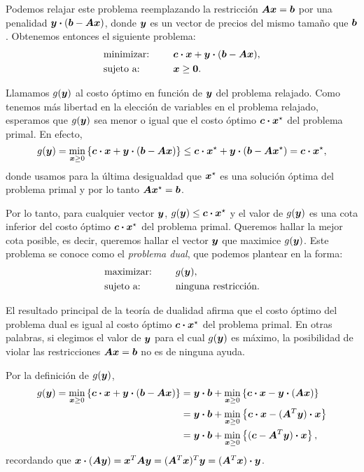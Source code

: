 Podemos relajar este problema reemplazando la restricción $\bm{A}\bm{x} = \bm{b}$ por una penalidad $\bm{y} \boldsymbol{\cdot} (\bm{b} - \bm{A}\bm{x})$, donde $\bm{y}$ es un vector de precios del mismo tamaño que $\bm{b}$. Obtenemos entonces el siguiente problema:
\begin{alignat*}{2}
  & \text{minimizar: } & & \bm{c} \boldsymbol{\cdot} \bm{x} + \bm{y} \boldsymbol{\cdot} (\bm{b} - \bm{A}\bm{x}), \\
   & \text{sujeto a: } & \quad & \bm{x} \ge \bm{0}.
\end{alignat*}

Llamamos $g(\bm{y})$ al costo óptimo en función de $\bm{y}$ del problema relajado. Como tenemos más libertad en la elección de variables en el problema relajado, esperamos que $g(\bm{y})$ sea menor o igual que el costo óptimo $\bm{c} \boldsymbol{\cdot} \bm{x}^\star$ del problema primal. En efecto,
$$
g(\bm{y}) = \min_{\bm{x} \ge 0} \left\{ \bm{c} \boldsymbol{\cdot} \bm{x} + \bm{y} \boldsymbol{\cdot} (\bm{b}-\bm{A}\bm{x})\right\} \le \bm{c} \boldsymbol{\cdot} \bm{x}^\star + \bm{y} \boldsymbol{\cdot} (\bm{b} - \bm{A}\bm{x}^\star) = \bm{c} \boldsymbol{\cdot} \bm{x}^\star,
$$
donde usamos para la última desigualdad que $\bm{x}^\star$ es una solución óptima del problema primal y por lo tanto $\bm{A}\bm{x}^\star = \bm{b}$.

Por lo tanto, para cualquier vector $\bm{y}$, $g(\bm{y}) \le \bm{c} \boldsymbol{\cdot} \bm{x}^\star$ y el valor de $g(\bm{y})$ es una cota inferior del costo óptimo $\bm{c} \boldsymbol{\cdot} \bm{x}^\star$ del problema primal. Queremos hallar la mejor cota posible, es decir, queremos hallar el vector $\bm{y}$ que maximice $g(\bm{y})$. Este problema se conoce como el \emph{problema dual}, que podemos plantear en la forma:
\begin{alignat*}{2}
  & \text{maximizar: } & & g(\bm{y}), \\
   & \text{sujeto a: } & \quad & \text{ninguna restricción}.
\end{alignat*}

El resultado principal de la teoría de dualidad afirma que el costo óptimo del problema dual es igual al costo óptimo $\bm{c} \boldsymbol{\cdot} \bm{x}^\star$ del problema primal. En otras palabras, si elegimos el valor de $\bm{y}$ para el cual $g(\bm{y})$ es máximo, la posibilidad de violar las restricciones $ \bm{A}\bm{x} = \bm{b}$ no es de ninguna ayuda.

Por la definición de $g(\bm{y})$,
$$
\begin{aligned}
g(\bm{y}) = \min_{\bm{x} \ge 0} \left\{ \bm{c} \boldsymbol{\cdot} \bm{x} + \bm{y} \boldsymbol{\cdot} (\bm{b}-\bm{A}\bm{x})\right\}
&= \bm{y} \boldsymbol{\cdot} \bm{b} + \min_{\bm{x} \ge 0} \left\{ \bm{c} \boldsymbol{\cdot} \bm{x} - \bm{y} \boldsymbol{\cdot} (\bm{A}\bm{x}) \right\} \\
&= \bm{y} \boldsymbol{\cdot} \bm{b} + \min_{\bm{x} \ge 0} \left\{ \bm{c} \boldsymbol{\cdot} \bm{x} - (\bm{A}^T\bm{y}) \boldsymbol{\cdot} \bm{x} \right\} \\
&= \bm{y} \boldsymbol{\cdot} \bm{b} + \min_{\bm{x} \ge 0} \left\{ (\bm{c} - \bm{A}^T\bm{y}) \boldsymbol{\cdot} \bm{x} \right\},
\end{aligned}
$$
recordando que $\bm{x} \boldsymbol{\cdot} (\bm{A}\bm{y}) = \bm{x}^T \bm{A} \bm{y} = (\bm{A}^T \bm{x})^T \bm{y} = (\bm{A}^T \bm{x}) \boldsymbol{\cdot} \bm{y}$.

